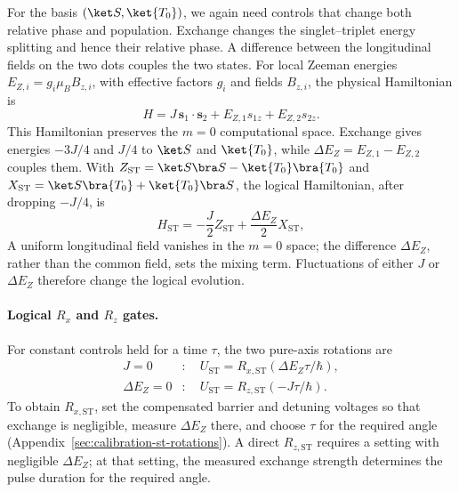 For the basis $(\ket S,\ket{T_0})$, we again need controls that
change both relative phase and population.
Exchange changes the singlet--triplet energy splitting and hence
their relative phase. A difference between the longitudinal fields
on the two dots couples the two states.
For local Zeeman energies $E_{Z,i}=g_i\mu_B B_{z,i}$,
with effective factors $g_i$ and fields $B_{z,i}$, the physical
Hamiltonian is
\begin{equation}
  H=J\,\mathbf{s}_1\cdot\mathbf{s}_2
    +E_{Z,1}s_{1z}+E_{Z,2}s_{2z}.
  \label{eq:st-physical-hamiltonian}
\end{equation}
This Hamiltonian preserves the $m=0$ computational space.
Exchange gives energies $-3J/4$ and $J/4$ to $\ket S$ and $\ket{T_0}$,
while $\Delta E_Z=E_{Z,1}-E_{Z,2}$ couples them.
With $Z_{\mathrm{ST}}=\ket S\bra S-\ket{T_0}\bra{T_0}$ and
$X_{\mathrm{ST}}=\ket S\bra{T_0}+\ket{T_0}\bra S$,
the logical Hamiltonian, after dropping $-J/4$, is
\begin{equation}
  H_{\mathrm{ST}}=-\frac{J}{2}Z_{\mathrm{ST}}
                   +\frac{\Delta E_Z}{2}X_{\mathrm{ST}},
  \label{eq:st-effective-hamiltonian}
\end{equation}
A uniform longitudinal field vanishes in the $m=0$ space; the
difference $\Delta E_Z$, rather than the common field, sets the
mixing term. Fluctuations of either $J$ or $\Delta E_Z$ therefore
change the logical evolution.

\paragraph{Logical \texorpdfstring{$R_x$ and $R_z$}{Rx and Rz} gates.}
For constant controls held for a time $\tau$, the two pure-axis
rotations are
\begin{equation}
  \begin{aligned}
   J=0 &: \quad U_{\mathrm{ST}}=R_{x,\mathrm{ST}}(\Delta E_Z\tau/\hbar),\\
   \Delta E_Z=0 &: \quad U_{\mathrm{ST}}=R_{z,\mathrm{ST}}(-J\tau/\hbar).
  \end{aligned}
  \label{eq:st-axis-limits}
\end{equation}
To obtain $R_{x,\mathrm{ST}}$, set the compensated barrier and detuning
voltages so that exchange is negligible, measure $\Delta E_Z$
there, and choose $\tau$ for the required angle
(Appendix~\ref{sec:calibration-st-rotations}). A direct
$R_{z,\mathrm{ST}}$ requires a setting with negligible
$\Delta E_Z$; at that setting, the measured exchange strength
determines the pulse duration for the required angle.

